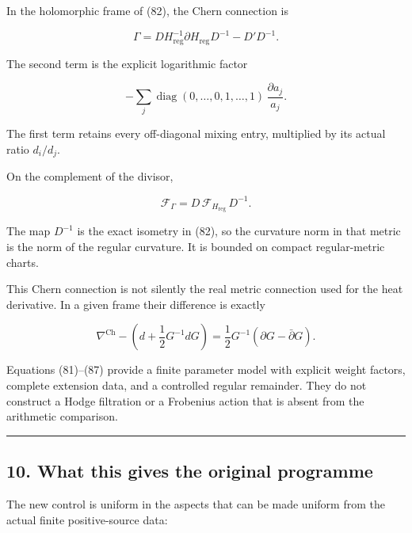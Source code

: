 \documentclass[11pt]{article}
\begin{document}
In the holomorphic frame of (82), the Chern connection is

\[
\boxed{
\Gamma
=
D H_{\mathrm{reg}}^{-1}\partial H_{\mathrm{reg}}D^{-1}
-D'D^{-1}.
}
\tag{85}
\]

The second term is the explicit logarithmic factor

\[
-\sum_j\operatorname{diag}(0,\ldots,0,1,\ldots,1)
\,\frac{\partial a_j}{a_j}.
\]

The first term retains every off-diagonal mixing entry, multiplied by its actual ratio \(d_i/d_j\).

On the complement of the divisor,

\[
\boxed{
\mathcal F_\Gamma
=
D\,\mathcal F_{H_{\mathrm{reg}}}\,D^{-1}.
}
\tag{86}
\]

The map \(D^{-1}\) is the exact isometry in (82), so the curvature norm in that metric is the norm of the regular curvature. It is bounded on compact regular-metric charts.

This Chern connection is not silently the real metric connection used for the heat derivative. In a given frame their difference is exactly

\[
\boxed{
\nabla^{\mathrm{Ch}}
-\left(d+\frac12G^{-1}dG\right)
=
\frac12G^{-1}(\partial G-\bar\partial G).
}
\tag{87}
\]

Equations (81)--(87) provide a finite parameter model with explicit weight factors, complete extension data, and a controlled regular remainder. They do not construct a Hodge filtration or a Frobenius action that is absent from the arithmetic comparison.

\begin{center}\rule{0.5\linewidth}{0.5pt}\end{center}

\subsection{10. What this gives the original programme}\label{what-this-gives-the-original-programme}

The new control is uniform in the aspects that can be made uniform from the actual finite positive-source data:
\end{document}
